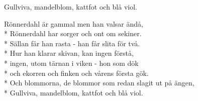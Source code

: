 \begin{SongText}
\begin{SongVerse}
        Gullviva, mandelblom, kattfot och blå viol.
    \end{SongVerse}
    \begin{SongVerse}
        Rönnerdahl är gammal men han valsar ändå,\\*%
        Rönnerdahl har sorger och ont om sekiner.\\*%
        Sällan får han rasta - han får slita för två.\\*%
        Hur han klarar skivan, kan ingen förstå,\\*%
        ingen, utom tärnan i viken - hon som dök\\*%
        och ekorren och finken och vårens första gök.\\*%
        Och blommorna, de blommor som redan slagit ut på ängen,\\*%
        Gullviva, mandelblom, kattfot och blå viol. 
    \end{SongVerse}
\end{SongText}